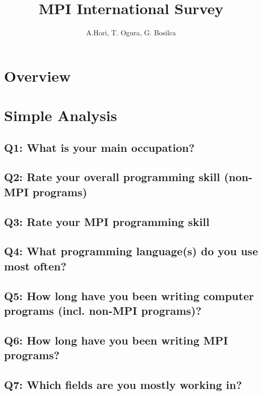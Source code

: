 \documentclass{report}
\title{MPI International Survey}
\author{A.Hori, T. Ogura, G. Bosilca}
\begin{document}
\maketitle

\todototoc
\listoftodos

\tableofcontents
\newpage

\chapter{Overview}


\chapter{Simple Analysis}
\section{Q1: What is your main occupation?}


\clearpage
\section{Q2: Rate your overall programming skill (non-MPI programs)}


\clearpage
\section{Q3: Rate your MPI programming skill}


\clearpage
\section{Q4: What programming language(s) do you use most often?}


\clearpage
\section{Q5: How long have you been writing computer programs (incl. non-MPI programs)?}


\clearpage
\section{Q6: How long have you been writing MPI programs?}


\clearpage
\section{Q7: Which fields are you mostly working in?}

\end{document}
